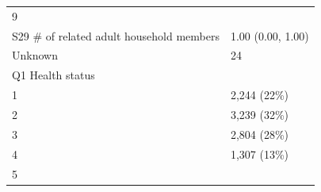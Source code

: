 \documentclass[]{article}
\begin{document}
\begin{longtable}[]{@{}ll@{}}
\begin{minipage}[t]{0.23\columnwidth}
9\strut
\end{minipage}\tabularnewline
\begin{minipage}[t]{0.71\columnwidth}\raggedright
S29 \# of related adult household members\strut
\end{minipage} & \begin{minipage}[t]{0.23\columnwidth}\raggedright
1.00 (0.00, 1.00)\strut
\end{minipage}\tabularnewline
\begin{minipage}[t]{0.71\columnwidth}\raggedright
Unknown\strut
\end{minipage} & \begin{minipage}[t]{0.23\columnwidth}\raggedright
24\strut
\end{minipage}\tabularnewline
\begin{minipage}[t]{0.71\columnwidth}\raggedright
Q1 Health status\strut
\end{minipage} & \begin{minipage}[t]{0.23\columnwidth}\raggedright
\strut
\end{minipage}\tabularnewline
\begin{minipage}[t]{0.71\columnwidth}\raggedright
1\strut
\end{minipage} & \begin{minipage}[t]{0.23\columnwidth}\raggedright
2,244 (22\%)\strut
\end{minipage}\tabularnewline
\begin{minipage}[t]{0.71\columnwidth}\raggedright
2\strut
\end{minipage} & \begin{minipage}[t]{0.23\columnwidth}\raggedright
3,239 (32\%)\strut
\end{minipage}\tabularnewline
\begin{minipage}[t]{0.71\columnwidth}\raggedright
3\strut
\end{minipage} & \begin{minipage}[t]{0.23\columnwidth}\raggedright
2,804 (28\%)\strut
\end{minipage}\tabularnewline
\begin{minipage}[t]{0.71\columnwidth}\raggedright
4\strut
\end{minipage} & \begin{minipage}[t]{0.23\columnwidth}\raggedright
1,307 (13\%)\strut
\end{minipage}\tabularnewline
\begin{minipage}[t]{0.71\columnwidth}\raggedright
5\strut
\end{minipage} & \begin{minipage}[t]{0.23\columnwidth}\raggedright

\end{minipage}
\end{longtable}
\end{document}
